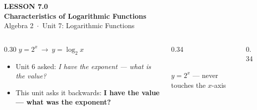 \documentclass[aspectratio=169, 11pt]{beamer}
\newcommand{\lgrid}[4]{%
  \draw[step=1, linegray!45, thin] (#1,#3) grid (#2,#4);
  \draw[->, thick, charcoal] (#1,0)--(#2,0) node[below right, font=\tiny]{$x$};
  \draw[->, thick, charcoal] (0,#3)--(0,#4) node[left, font=\tiny]{$y$};}
\begin{document}
{
\begin{frame}[plain]
  \vspace{2.8cm}\hspace{0.55cm}%
  \begin{minipage}{0.9\textwidth}
    {\color{goldacc}\bfseries\small LESSON 7.0}\\[0.5cm]
    {\color{white}\bfseries\LARGE Characteristics of Logarithmic Functions}\\[1.2cm]
    {\color{forestmid}\small Algebra 2~$\cdot$~Unit 7: Logarithmic Functions}
  \end{minipage}
\end{frame}
}

\begin{frame}[t, plain]
  \begin{columns}[T]
    \begin{column}{0.30\textwidth}
      \centering $y = 2^x \ \longrightarrow\ y=\log_2 x$
      \begin{itemize}\setlength{\itemsep}{4pt}
        \item Unit 6 asked: \emph{I have the exponent --- what is the value?}
        \item This unit asks it backwards: \textbf{I have the value --- what was the exponent?}
      \end{itemize}
    \end{column}
    \begin{column}{0.34\textwidth}
      \centering
      \\[2pt]
      {\footnotesize $y=2^x$ --- never touches the $x$-axis}
    \end{column}
    \begin{column}{0.34\textwidth}
      \centering
\end{column}
\end{columns}
\end{frame}
\end{document}
